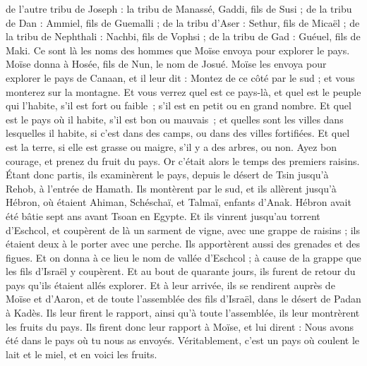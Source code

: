 \begin{multicols}{2}
de l'autre tribu de Joseph : la tribu de Manassé, Gaddi, fils de Susi ;
de la tribu de Dan : Ammiel, fils de Guemalli ;
de la tribu d'Aser : Sethur, fils de Micaël ;
de la tribu de Nephthali : Nachbi, fils de Vophsi ;
de la tribu de Gad : Guéuel, fils de Maki.
Ce sont là les noms des hommes que Moïse envoya pour explorer le pays. Moïse donna à Hosée, fils de Nun, le nom de Josué.
Moïse les envoya pour explorer le pays de Canaan, et il leur dit : Montez de ce côté par le sud ; et vous monterez sur la montagne.
Et vous verrez quel est ce pays-là, et quel est le peuple qui l’habite, s’il est fort ou faible ; s’il est en petit ou en grand nombre.
Et quel est le pays où il habite, s’il est bon ou mauvais ; et quelles sont les villes dans lesquelles il habite, si c’est dans des camps, ou dans des villes fortifiées.
Et quel est la terre, si elle est grasse ou maigre, s’il y a des arbres, ou non. Ayez bon courage, et prenez du fruit du pays. Or c’était alors le temps des premiers raisins.
Étant donc partis, ils examinèrent le pays, depuis le désert de Tsin jusqu'à Rehob, à l'entrée de Hamath.
Ils montèrent par le sud, et ils allèrent jusqu'à Hébron, où étaient Ahiman, Schéschaï, et Talmaï, enfants d'Anak. Hébron avait été bâtie sept ans avant Tsoan en Egypte.
Et ils vinrent jusqu'au torrent d'Eschcol, et coupèrent de là un sarment de vigne, avec une grappe de raisins ; ils étaient deux à le porter avec une perche. Ils apportèrent aussi des grenades et des figues.
Et on donna à ce lieu le nom de vallée d'Eschcol ; à cause de la grappe que les fils d'Israël y coupèrent.
Et au bout de quarante jours, ils furent de retour du pays qu'ils étaient allés explorer.
Et à leur arrivée, ils se rendirent auprès de Moïse et d'Aaron, et de toute l'assemblée des fils d'Israël, dans le désert de Padan à Kadès. Ils leur firent le rapport, ainsi qu'à toute l'assemblée, ils leur montrèrent les fruits du pays.
Ils firent donc leur rapport à Moïse, et lui dirent : Nous avons été dans le pays où tu nous as envoyés. Véritablement, c'est un pays où coulent le lait et le miel, et en voici les fruits.

\end{multicols}
